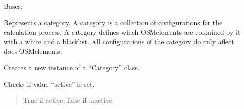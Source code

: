\documentclass[letterpaper,10pt,english]{sphinxmanual}
\begin{document}
\begin{fulllineitems}
\label{\detokenize{apidoc/src.osm_configurator.model.project.configuration:src.osm_configurator.model.project.configuration.category.Category}}
\pysigstartsignatures
{}
\pysigstopsignatures
\sphinxAtStartPar
Bases: 

\sphinxAtStartPar
Represents a category. A category is a collection of configurations for the calculation process. A category defines which OSM\sphinxhyphen{}elements are contained by it with a white\sphinxhyphen{} and a blacklist. All configurations of the category do only affect does OSM\sphinxhyphen{}elements.

\begin{fulllineitems}
\label{\detokenize{apidoc/src.osm_configurator.model.project.configuration:src.osm_configurator.model.project.configuration.category.Category.__init__}}
\pysigstartsignatures
{}
\pysigstopsignatures
\sphinxAtStartPar
Creates a new instance of a “Category” class.

\end{fulllineitems}


\begin{fulllineitems}
\label{\detokenize{apidoc/src.osm_configurator.model.project.configuration:src.osm_configurator.model.project.configuration.category.Category.is_active}}
\pysigstartsignatures
{}
\pysigstopsignatures
\sphinxAtStartPar
Checks if value “active” is set.
\begin{quote}\begin{description}
\sphinxAtStartPar
True if active, false if inactive.

\sphinxAtStartPar
{}

\end{description}\end{quote}


\end{fulllineitems}
\end{fulllineitems}
\end{document}
